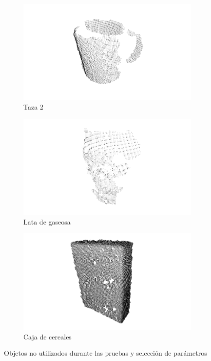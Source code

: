 \begin{figure}
	\begin{subfigure}[b]{0.3\textwidth}
		\includegraphics[width=\textwidth]{img/obj_nuevos/coffee_mug_pcd.png}
		\caption{Taza 2}
		\label{frame_frame_sistema-rgb-d_taza}
	\end{subfigure}
	\quad
	\begin{subfigure}[b]{0.3\textwidth}
		\includegraphics[width=\textwidth]{img/obj_nuevos/soda_can_pcd.png}
		\caption{Lata de gaseosa}
	\end{subfigure}
	\quad
	\begin{subfigure}[b]{0.3\textwidth}
		\includegraphics[width=\textwidth]{img/obj_nuevos/cereal_box_pcd.png}
		\caption{Caja de cereales}
	\end{subfigure}

	\caption{Objetos no utilizados durante las pruebas y selección de parámetros}
	\label{new_objects}
\end{figure}

